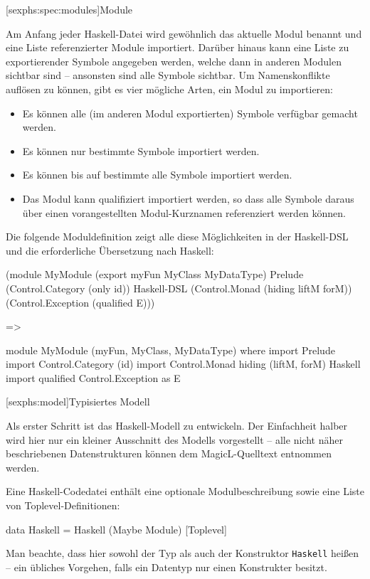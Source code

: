 \documentclass[12pt, a4paper, bibgerm]{scrbook}
\newenvironment{DIFnomarkup}{}{}
\newcommand\icode[1]{\lstinline?#1?}
\newcommand\lsection{}
\newcommand\lsubsection{}
\begin{document}
\lsubsection[sexphs:spec:modules]{Module}

Am Anfang jeder Haskell-Datei wird gewöhnlich das aktuelle Modul
benannt und eine Liste referenzierter Module importiert. Darüber
hinaus kann eine Liste zu exportierender Symbole angegeben werden,
welche dann in anderen Modulen sichtbar sind -- ansonsten sind alle
Symbole sichtbar. Um Namenskonflikte auflösen zu können, gibt es vier
mögliche Arten, ein Modul zu importieren:
\begin{itemize}
\item Es können alle (im anderen Modul exportierten) Symbole verfügbar gemacht
  werden.
\item Es können nur bestimmte Symbole importiert werden.
\item Es können bis auf bestimmte alle Symbole importiert werden.
\item Das Modul kann qualifiziert importiert werden, so dass alle
  Symbole daraus über einen vorangestellten Modul-Kurznamen
  referenziert werden können.
\end{itemize}
Die folgende Moduldefinition zeigt alle diese Möglichkeiten in der
Haskell-DSL und die erforderliche Übersetzung nach Haskell:
\begin{DIFnomarkup}\begin{code}
(module MyModule
  (export myFun MyClass MyDataType)
  Prelude
  (Control.Category (only id))                       Haskell-DSL
  (Control.Monad (hiding liftM forM))
  (Control.Exception (qualified E)))

=>

module MyModule (myFun, MyClass, MyDataType) where
import Prelude
import Control.Category (id)
import Control.Monad hiding (liftM, forM)            Haskell
import qualified Control.Exception as E
\end{code}\end{DIFnomarkup}


\lsection[sexphs:model]{Typisiertes Modell}

Als erster Schritt ist das Haskell-Modell zu entwickeln. Der Einfachheit
halber wird hier nur ein kleiner Ausschnitt des Modells vorgestellt --
alle nicht näher beschriebenen Datenstrukturen können dem
MagicL-Quelltext entnommen werden.

Eine Haskell-Codedatei enthält eine optionale Modulbeschreibung sowie
eine Liste von Toplevel-Definitionen:
\begin{DIFnomarkup}\begin{code}
data Haskell = Haskell (Maybe Module) [Toplevel]
\end{code}\end{DIFnomarkup}
Man beachte, dass hier sowohl der Typ als auch der Konstruktor
\icode{Haskell} heißen -- ein übliches Vorgehen, falls ein Datentyp nur
einen Konstrukter besitzt.
\end{document}

